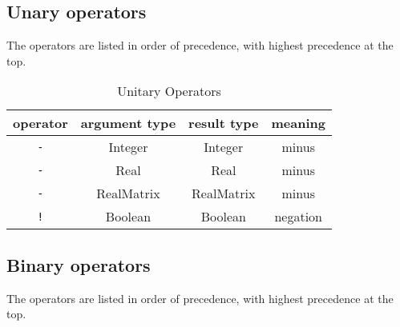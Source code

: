 \subsection{Unary operators}
\label{sec:builtin-unary-ops}

The operators are listed in order of precedence, with highest precedence at the
top.

\begin{table}[H]
\centering
\caption{Unitary Operators}
\begin{tabular}{ c c c c }
\toprule
operator & argument type & result type & meaning \\
\midrule
\verb|-| & Integer & Integer & minus \\
\verb|-| & Real & Real & minus \\
\verb|-| & RealMatrix & RealMatrix & minus \\
\verb|!| & Boolean & Boolean & negation \\
\bottomrule
\end{tabular}
\end{table}



\subsection{Binary operators}
\label{sec:builtin-binary-ops}

The operators are listed in order of precedence, with highest precedence at the
top.

